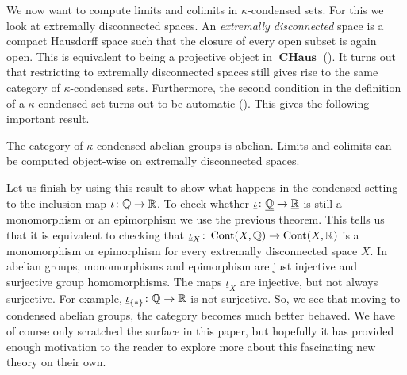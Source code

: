 \documentclass{article}
\DeclareMathOperator{\Cont}{Cont}
\DeclareMathOperator{\CHaus}{\mathbf{CHaus}}
\begin{document}
We now want to compute limits and colimits
in $\kappa$-condensed sets. For this we look
at extremally disconnected spaces.
An \emph{extremally disconnected} space is a compact Hausdorff
space such that the closure of every open subset is again open.
This is equivalent to being a projective object in $\CHaus$ (\cite[Theorem 2.5]{Gle1958ProjectiveTS}).
It turns out that restricting to extremally disconnected spaces still gives
rise to the same category of $\kappa$-condensed sets. Furthermore,
the second condition in the definition of a $\kappa$-condensed set
turns out to be automatic (\cite[Section 1.2]{Dag2021FoundationsCM}).
This gives the following important result.
\begin{theorem}
    The category of $\kappa$-condensed abelian groups is abelian.
    Limits and colimits can be computed object-wise on extremally
    disconnected spaces.
\end{theorem}
Let us finish by using this result to show what happens
in the condensed setting to the inclusion map $\iota \colon \mathbb{Q} \to \mathbb{R}$.
To check whether $\underline{\iota} \colon \underline{\mathbb{Q}} \to \underline{\mathbb{R}}$
is still a monomorphism or an epimorphism we use the previous theorem.
This tells us that it is equivalent to checking that
$\underline{\iota}_X \colon \Cont(X, \bbQ) \to \Cont(X, \bbR)$
is a monomorphism or epimorphism for every extremally disconnected space $X$.
In abelian groups, monomorphisms and epimorphism are just injective and surjective group
homomorphisms. The maps $\underline{\iota}_X$ are injective, but not always surjective.
For example, $\underline{\iota}_{\{*\}} \colon \mathbb{Q} \to \mathbb{R}$ is not surjective.
So, we see that moving to condensed abelian groups, the category becomes much
better behaved.
We have of course only scratched the surface in this paper, but
hopefully it has provided enough motivation to the reader to explore more about this fascinating
new theory on their own.



\end{document}
